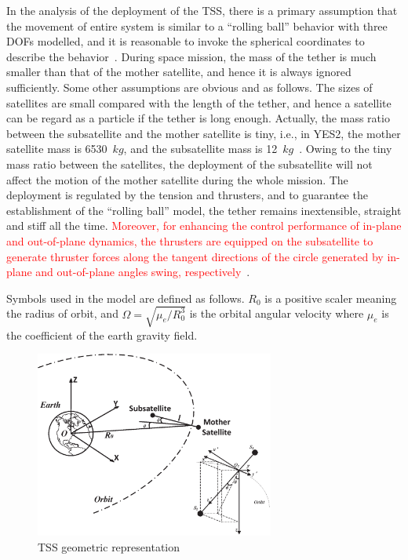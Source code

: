 \documentclass[3p]{elsarticle}
\theoremstyle{plain}
\theoremstyle{remark}
\begin{document}
In the analysis of the deployment of the TSS, there is a primary assumption that the movement of entire system is similar to a ``rolling ball'' behavior with three DOFs modelled, and it is reasonable to invoke the spherical coordinates to describe the behavior~\cite{Williams2008}. During space mission, the mass of the tether is much smaller than that of the mother satellite, and hence it is always ignored sufficiently. Some other assumptions are obvious and as follows. The sizes of satellites are small compared with the length of the tether, and hence a satellite can be regard as a particle if the tether is long enough. Actually, the mass ratio between the subsatellite and the mother satellite is tiny, i.e., in YES2, the mother satellite mass is 6530~$kg$, and the subsatellite mass is 12~$kg$~\cite{Williams2008}.  Owing to the tiny mass ratio between the satellites, the deployment of the subsatellite will not affect the motion of the mother satellite during the whole mission. The deployment is regulated by the tension and thrusters, and to guarantee the establishment of the ``rolling ball'' model, the tether remains inextensible, straight and stiff all the time. \textcolor{red}{Moreover, for enhancing the control performance of in-plane and out-of-plane dynamics, the thrusters are equipped on the subsatellite to generate thruster forces along the tangent directions of the circle generated by in-plane and out-of-plane angles swing, respectively~\cite{liu2014attitude}}.\par
Symbols used in the model are defined as follows. $R_0$ is a positive scaler meaning the radius of orbit, and $\Omega = \sqrt{\mu_e/R_0^3}$ is the orbital angular velocity where $\mu_e$ is the coefficient of the earth gravity field.\par
\begin{figure}[http]
\centering
\includegraphics[width=0.7\textwidth]{paper4_fig1.eps}
\caption{TSS geometric representation}
\label{fig:1}
\end{figure}
\end{document}
